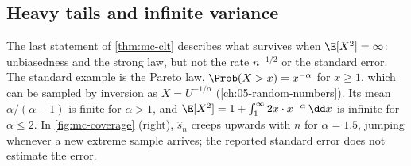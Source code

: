\subsection{Heavy tails and infinite variance}

The last statement of \cref{thm:mc-clt} describes what survives when $\E[X^2]=\infty$:
unbiasedness and the strong law, but not the rate $n^{-1/2}$ or the standard error. The standard example is the Pareto law,
$\Prob(X>x)=x^{-\alpha}$ for $x\ge1$, which can be sampled by inversion as
$X=U^{-1/\alpha}$ (\cref{ch:05-random-numbers}). Its mean $\alpha/(\alpha-1)$ is finite for
$\alpha>1$, and $\E[X^2]=1+\int_1^\infty 2x\cdot x^{-\alpha}\,\dd x$ is infinite for
$\alpha\le2$. In \cref{fig:mc-coverage} (right), $\hat s_n$ creeps upwards with $n$ for
$\alpha=1.5$, jumping whenever a new extreme sample arrives; the reported standard error
does not estimate the error.

